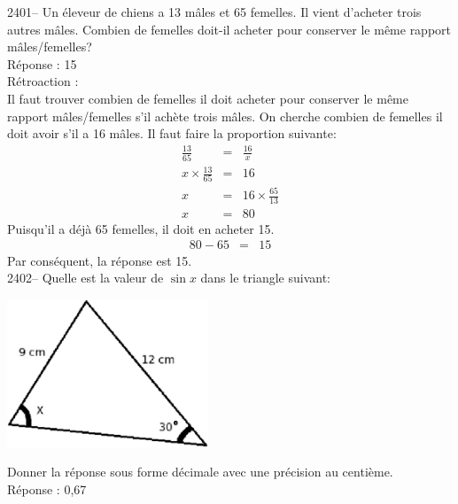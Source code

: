 \documentclass[letterpaper, 12pt]{article}
\begin{document}
2401-- Un \'eleveur de chiens a 13 m\^ales et 65 femelles. Il vient d'acheter trois autres m\^ales. Combien de femelles doit-il acheter pour conserver le m\^eme rapport m\^ales/femelles?\\

R\'eponse : 15\\

R\'etroaction :\\
Il faut trouver combien de femelles il doit acheter pour conserver le m\^eme rapport m\^ales/femelles s'il ach\`ete trois m\^ales. On cherche combien de femelles il doit avoir s'il a 16 m\^ales. Il faut faire la proportion suivante:
\begin{eqnarray*}
 \frac{13}{65}&=&\frac{16}{x}\\[2mm]
x \times  \frac{13}{65}&=&16\\[2mm]
x &=&16 \times \frac{65}{13}\\[2mm]
x &=&80
\end{eqnarray*}
Puisqu'il a d\'ej\`a 65 femelles, il doit en acheter 15.
\begin{eqnarray*}
 80-65&=&15
\end{eqnarray*}
Par cons\'equent, la r\'eponse est 15.\\


2402-- Quelle est la valeur de $\sin{x}$ dans le triangle suivant:
\begin{center}
 \includegraphics[width=6cm,bb=14 14 688 582]{Q2402.eps}
\end{center}
Donner la r\'eponse sous forme d\'ecimale avec une pr\'ecision au centi\`eme.\\

R\'eponse : 0,67\\
\end{document}
